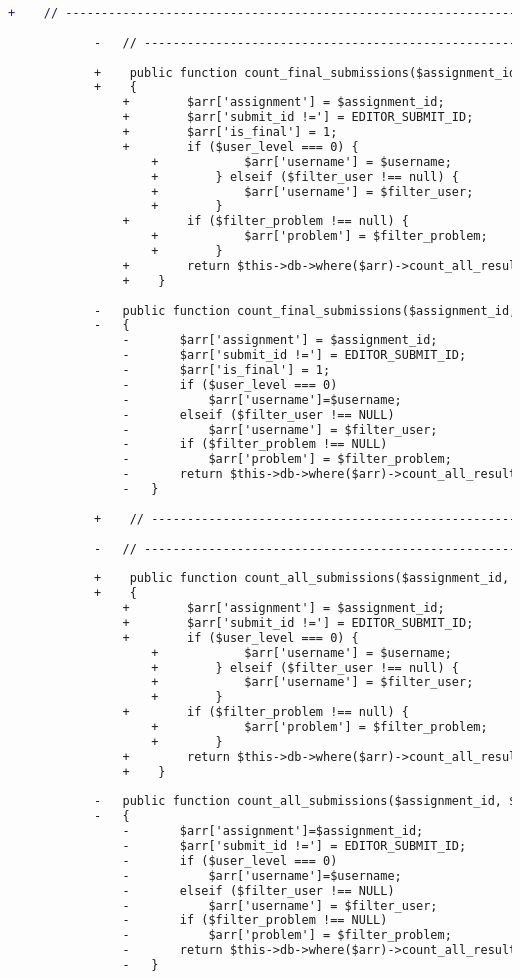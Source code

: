 \begin{lstlisting}[language=diff, caption=Perubahan pada kode Submit\_model.php]
			+    // ------------------------------------------------------------------------
			
			-	// ------------------------------------------------------------------------
			
			+    public function count_final_submissions($assignment_id, $user_level, $username, $filter_user = null, $filter_problem = null)
			+    {
				+        $arr['assignment'] = $assignment_id;
				+        $arr['submit_id !='] = EDITOR_SUBMIT_ID;
				+        $arr['is_final'] = 1;
				+        if ($user_level === 0) {
					+            $arr['username'] = $username;
					+        } elseif ($filter_user !== null) {
					+            $arr['username'] = $filter_user;
					+        }
				+        if ($filter_problem !== null) {
					+            $arr['problem'] = $filter_problem;
					+        }
				+        return $this->db->where($arr)->count_all_results('submissions');
				+    }
			
			-	public function count_final_submissions($assignment_id, $user_level, $username, $filter_user = NULL, $filter_problem = NULL)
			-	{
				-		$arr['assignment'] = $assignment_id;
				-		$arr['submit_id !='] = EDITOR_SUBMIT_ID;
				-		$arr['is_final'] = 1;
				-		if ($user_level === 0)
				-			$arr['username']=$username;
				-		elseif ($filter_user !== NULL)
				-			$arr['username'] = $filter_user;
				-		if ($filter_problem !== NULL)
				-			$arr['problem'] = $filter_problem;
				-		return $this->db->where($arr)->count_all_results('submissions');
				-	}
			
			+    // ------------------------------------------------------------------------
			
			-	// ------------------------------------------------------------------------
			
			+    public function count_all_submissions($assignment_id, $user_level, $username, $filter_user = null, $filter_problem = null)
			+    {
				+        $arr['assignment'] = $assignment_id;
				+        $arr['submit_id !='] = EDITOR_SUBMIT_ID;
				+        if ($user_level === 0) {
					+            $arr['username'] = $username;
					+        } elseif ($filter_user !== null) {
					+            $arr['username'] = $filter_user;
					+        }
				+        if ($filter_problem !== null) {
					+            $arr['problem'] = $filter_problem;
					+        }
				+        return $this->db->where($arr)->count_all_results('submissions');
				+    }
			
			-	public function count_all_submissions($assignment_id, $user_level, $username, $filter_user = NULL, $filter_problem = NULL)
			-	{
				-		$arr['assignment']=$assignment_id;
				-		$arr['submit_id !='] = EDITOR_SUBMIT_ID;
				-		if ($user_level === 0)
				-			$arr['username']=$username;
				-		elseif ($filter_user !== NULL)
				-			$arr['username'] = $filter_user;
				-		if ($filter_problem !== NULL)
				-			$arr['problem'] = $filter_problem;
				-		return $this->db->where($arr)->count_all_results('submissions');
				-	}
			

\end{lstlisting}
